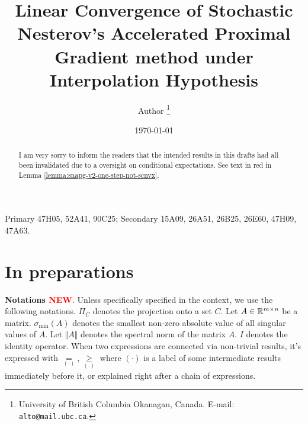 \documentclass[12pt]{article}
\begin{document}
\title{{\selectfont Linear Convergence of Stochastic Nesterov's Accelerated Proximal Gradient method under Interpolation Hypothesis}}

\author{
    Author
    \thanks{
        University of British Columbia Okanagan,
        Canada. E-mail: \texttt{alto@mail.ubc.ca}.
    }
}

\date{\today}

\maketitle
{}

\begin{abstract} 
    I am very sorry to inform the readers that the intended results in this drafts had all been invalidated due to a oversight on conditional expectations. 
    See text in red in Lemma \ref{lemma:snapg-v2-one-step-not-scnvx}. 

\end{abstract}

Primary 47H05, 52A41, 90C25; Secondary 15A09, 26A51, 26B25, 26E60, 47H09, 47A63.


\section{In preparations}
    \textbf{Notations \textcolor{red}{NEW}}. 
    Unless specifically specified in the context, we use the following notations. 
    $\Pi_C$ denotes the projection onto a set $C$. 
    Let $A \in \mathbb R^{m \times n}$ be a matrix. 
    $\sigma_{\min}(A)$ denotes the smallest non-zero absolute value of all singular values of $A$. 
    Let $\Vert A\Vert$ denotes the spectral norm of the matrix $A$. 
    $I$ denotes the identity operator. 
    When two expressions are connected via non-trivial results, it's expressed with $\underset{(\cdot)}{=}, \underset{(\cdot)}{\ge}$ where $(\cdot)$ is a label of some intermediate results immediately before it, or explained right after a chain of expressions. 
\end{document}
